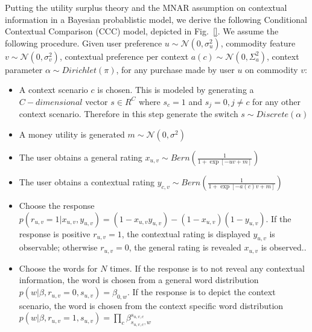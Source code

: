 \documentclass{llncs}
\begin{document}
Putting the utility surplus theory and the MNAR assumption on contextual information in a Bayesian probablistic model, we derive the following Conditional Contextual Comparison (CCC) model, depicted in Fig.~\ref{}. We assume the following procedure. Given user preference $u\sim \mathcal{N}(0,\sigma_u^2)$, commodity feature $v\sim \mathcal{N}(0,\sigma_v^2)$, contextual preference per context $a(c)\sim \mathcal{N}(0,\Sigma_a^2)$, context parameter $\alpha\sim Dirichlet(\pi)$, for any purchase made by user $u$ on commodity $v$:
\begin{itemize}
\item A context scenario $c$ is chosen. This is modeled by generating a $C-dimensional$ vector $s\in R^C$  where $s_c=1$ and $s_j=0,j\neq c$ for any other context scenario. Therefore in this step generate the switch $s\sim Discrete(\alpha) $
\item A money utility is generated $m\sim \mathcal{N}(0,\sigma^2)$
\item The user obtains a general rating $x_{u,v}\sim Bern(\frac{1}{1+\exp{[-uv + m ]}})$
\item The user obtains a contextual rating $y_{c,v}\sim Bern( \frac{1}{1+\exp{[-a(c) v+m]}})$
\item Choose the response $p(r_{u,v}=1|x_{u,v},y_{u,v})=(1-x_{u,v}y_{u,v})-(1-x_{u,v})(1-y_{u,v})$. If the response is positive $r_{u,v}=1$, the contextual rating is displayed $y_{u,v}$ is observable; otherwise  $r_{u,v}=0$, the general rating is revealed $x_{u,v}$ is observed..
\item Choose the words for $N$ times. If the response is to not reveal any contextual information, the word is chosen from a general word distribution $p(w|\beta,r_{u,v}=0,s_{u,v})=\beta_{0,w}$. If the response is to depict the context scenario, the word is chosen from the context specific word distribution $p(w|\beta,r_{u,v}=1,s_{u,v})=\prod_c  \beta_{s_{u,v,c},w}^{s_{u,v,c}}$
\end{itemize}

\end{document}
